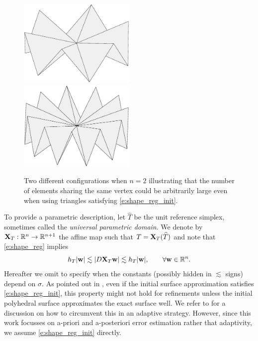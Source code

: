 %
\begin{figure}[ht!]
\centerline{\includegraphics[width=0.5\textwidth]{shape_n12}
\includegraphics[width=0.5\textwidth]{shape_n22}}
\caption{
Two different configurations when $n=2$ illustrating that the number of elements sharing the same vertex could be arbitrarily large even when using triangles satisfying \eqref{e:shape_reg_init}.} \label{f:valence}
\end{figure}

To provide a parametric description,
let $\widehat{T}$ be the unit reference simplex, sometimes called the {\it universal parametric domain}.
We denote by ${\bf X}_T:\mathbb R^n\to\mathbb R^{n+1}$ the affine map such that $T = {\bf X}_T(\widehat{T})$ and note that \eqref{e:shape_reg} implies
%
\begin{equation}\label{e:shape_reg_init}
h_T | {\bf w}|  \lesssim | D {\bf X}_T {\bf w} | \lesssim h_T | {\bf w}|, \qquad \forall {\bf w} \in \mathbb R^n. 
\end{equation}
Hereafter we omit to specify when the constants (possibly hidden in $\lesssim$ signs) depend on $\sigma$.
As pointed out in \cite{BP:11}, even if the initial surface approximation satisfies \eqref{e:shape_reg_init}, this property might not hold for refinements unless the initial polyhedral surface approximates the exact surface well. 
We refer to \cite{BCMMN16,BCMN:Magenes} for a discussion on how to circumvent this in an adaptive strategy.
However, since this work focusses on a-priori and a-posteriori error estimation rather that adaptivity, we assume \eqref{e:shape_reg_init} directly. 
%

